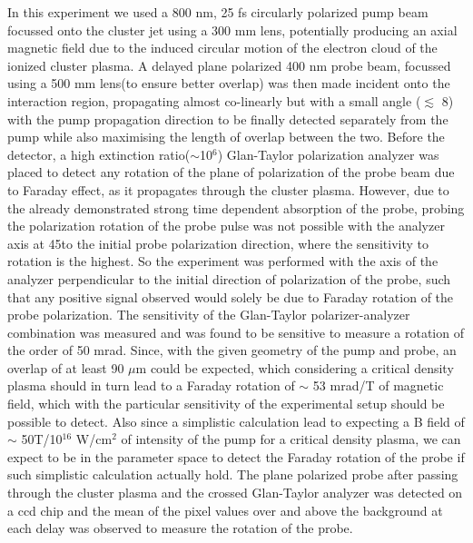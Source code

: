 \documentclass[a4paper,12pt]{article}
\begin{document}
In this experiment we used a 800 nm, 25 fs circularly polarized pump beam focussed onto the cluster jet using a 300 mm lens, potentially producing an axial magnetic field due to the induced circular motion of the electron cloud of the ionized cluster plasma. A delayed plane polarized 400 nm probe beam, focussed using a 500 mm lens(to ensure better overlap) was then made incident onto the interaction region, propagating almost co-linearly but with a small angle ($\lesssim$ 8\textdegree) with the pump propagation direction to be finally detected separately from the pump while also maximising the length of overlap between the two. Before the detector, a high extinction ratio($\sim$10$^6$) Glan-Taylor polarization analyzer  was placed to detect any rotation of the plane of polarization of the probe beam due to Faraday effect, as it propagates through the cluster plasma. However, due to the already demonstrated strong time dependent absorption of the probe, probing the polarization rotation of the probe pulse was not possible with the analyzer axis at 45\textdegree to the initial probe polarization direction, where the sensitivity to rotation is the highest. So the experiment was performed with the axis of the analyzer perpendicular to the initial direction of polarization of the probe, such that any positive signal observed would solely be due to Faraday rotation of the probe polarization. The sensitivity of the Glan-Taylor polarizer-analyzer combination was measured and was found to be sensitive to measure a rotation of the order of 50 mrad. Since, with the given geometry of the pump and probe, an overlap of at least 90 $\mu$m could be expected, which considering a critical density plasma should in turn lead to a Faraday rotation of $\sim$ 53 mrad/T of magnetic field, which with the particular sensitivity of the experimental setup should be possible to detect. Also since a simplistic calculation lead to expecting a B field of $\sim$ 50T/10$^{16}$ W/cm$^{2}$ of intensity of the pump for a critical density plasma\cite{eliezer}, we can expect to be in the parameter space to detect the Faraday rotation of the probe if such simplistic calculation actually hold. The plane polarized probe after passing through the cluster plasma and the crossed Glan-Taylor analyzer was detected on a ccd chip and the mean of the pixel values over and above the background at each delay was observed to measure the rotation of the probe.
\end{document}
